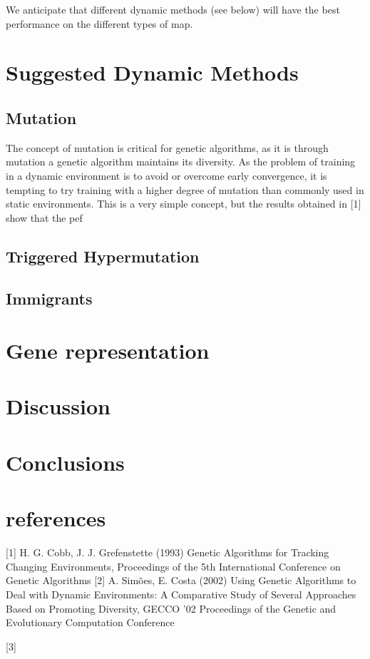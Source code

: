 \documentclass[a4paper,12pt]{article}
\begin{document}
We anticipate that different dynamic methods (see below) will have the best performance on the different types of map.

\section{Suggested Dynamic Methods}
\subsection{Mutation}
The concept of mutation is critical for genetic algorithms, as it is through mutation a genetic algorithm maintains its diversity. As the problem of training in a dynamic environment is to avoid or overcome early convergence, it is tempting to try training with a higher degree of mutation than commonly used in static environments. This is a very simple concept, but the results obtained in [1] show that the pef
\subsection{Triggered Hypermutation}


\subsection{Immigrants}

\section{Gene representation}
\section{Discussion}

\section{Conclusions}

\section{references}
[1] H. G. Cobb, J. J. Grefenstette (1993) Genetic Algorithms for Tracking Changing Environments, Proceedings of the 5th International Conference on Genetic Algorithms
[2] A. Simões, E. Costa (2002) Using Genetic Algorithms to Deal with Dynamic Environments: A Comparative Study of Several Approaches Based on Promoting Diversity, GECCO '02 Proceedings of the Genetic and Evolutionary Computation Conference

[3]
\end{document}
